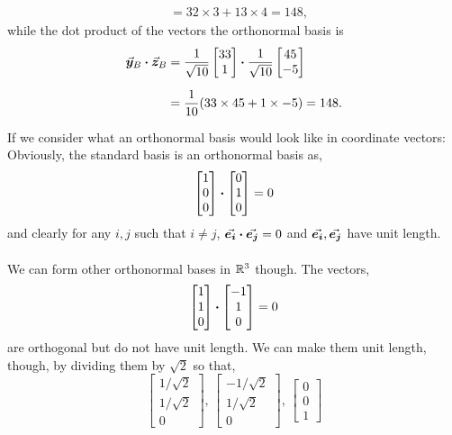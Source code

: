 \documentclass[../MathsNotesBase.tex]{subfiles}
\begin{document}
{\begin{exe}
{\[\begin{aligned}
					&= 32 \times 3 + 13 \times 4 = 148,
				\end{aligned}\]
				while the dot product of the vectors \wrt the orthonormal basis is
				\[\begin{aligned}
					\y_B \dotprod \z_B &= \frac{1}{\sqrt{10}} \begin{bmatrix}33 \\ 1\end{bmatrix} \dotprod \frac{1}{\sqrt{10}} \begin{bmatrix}45 \\ -5\end{bmatrix} \nn
					&= \frac{1}{10} (33 \times 45 + 1 \times -5) = 148.
				\end{aligned}\]
			}
		\end{exe}
	
		\biggerskip
		If we consider what an orthonormal basis would look like in coordinate vectors: Obviously, the standard basis is an orthonormal basis as,
			\[ \begin{bmatrix}1\\0\\0\end{bmatrix} \boldsymbol{\cdot} \begin{bmatrix}0\\1\\0\end{bmatrix} = 0 \]
		and clearly for any ${ i,j }$ such that ${ i \neq j }$, ${ \vec{\bm{e_i}} \boldsymbol{\cdot} \vec{\bm{e_j}} = 0 }$ and ${\vec{\bm{e_i}}, \vec{\bm{e_j}} }$ have unit length.\\\\
		We can form other orthonormal bases in $\mathbb{R}^{3}$ though. The vectors,
		\[ \begin{bmatrix}1\\1\\0\end{bmatrix} \boldsymbol{\cdot} \begin{bmatrix}-1\\1\\0\end{bmatrix} = 0 \]
		are orthogonal but do not have unit length. We can make them unit length, though, by dividing them by $\sqrt{2}$ so that,
		\[ \begin{bmatrix}1/\sqrt{2}\\1/\sqrt{2}\\0\end{bmatrix},\, \begin{bmatrix}-1/\sqrt{2}\\1/\sqrt{2}\\0\end{bmatrix},\, \begin{bmatrix}0\\0\\1\end{bmatrix} \]
}
\end{document}
